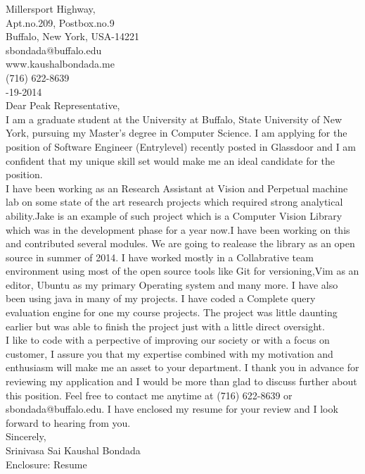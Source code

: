\documentclass[10pt,letterpaper,oneside]{article}
\begin{document}
 Millersport Highway,\\
Apt.no.209, Postbox.no.9\\
Buffalo, New York, USA-14221\\
sbondada@buffalo.edu\\
www.kaushalbondada.me\\
(716) 622-8639\\

-19-2014\\
 
\noindent Dear Peak Representative,\\
 
I am a graduate student at the University at Buffalo, State University of New York, pursuing my Master's degree in Computer Science. I am applying
for the position of Software Engineer (Entrylevel) recently posted  in Glassdoor and I am confident that my unique skill set would
make me an ideal candidate for the position.\\

I have been working as an Research Assistant at Vision and Perpetual machine lab on some state of the art research  projects which required strong
analytical ability.Jake is an example of such project which is a Computer Vision Library which was in the development phase for a year now.I have been working on this and contributed several modules. We are going to realease the library as an open source in summer of 2014. I have worked mostly in a Collabrative
team environment using most of the open source tools like Git for versioning,Vim as an editor, Ubuntu as my primary Operating system and many
more. I have also been using java in many of my projects. I have coded a Complete query evaluation engine for one my course projects. The
project was little daunting earlier but was able to finish the project just with a little direct oversight.\\
 
I like to code with a perpective of improving our society or with a focus on customer, I assure you that my expertise combined with my motivation
and enthusiasm will make me an asset to your department. I thank you in advance for reviewing my application and I would be more than glad to
discuss further about this position. Feel free to contact me anytime at (716) 622-8639 or sbondada@buffalo.edu. I have enclosed my resume for your review and I look forward to hearing from you.\\
 
\noindent Sincerely,\\
Srinivasa Sai Kaushal Bondada\\
Enclosure: Resume\\
\end{document}
